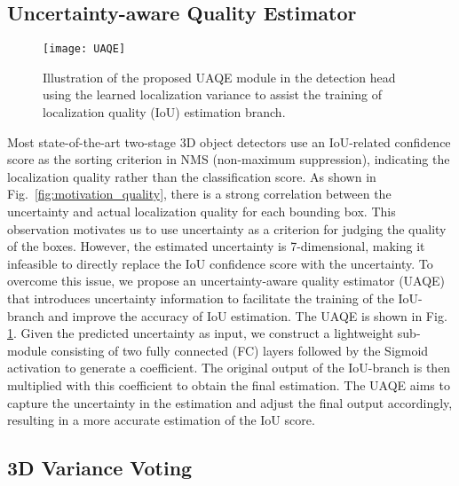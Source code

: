 \documentclass[twocolumn]{svjour3}
\begin{document}
\subsection{Uncertainty-aware Quality Estimator}\label{sec:UAQE}

\begin{figure}[t]
\centering
\texttt{[image: UAQE]}
\caption{Illustration of the proposed UAQE module in the detection head using the learned localization variance to assist the training of localization quality (IoU) estimation branch.}
\label{fig:head}
\end{figure}

Most state-of-the-art two-stage 3D object detectors use an IoU-related confidence score as the sorting criterion in NMS (non-maximum suppression), indicating the localization quality rather than the classification score.
As shown in Fig.~\ref{fig:motivation_quality}, there is a strong correlation between the uncertainty and actual localization quality for each bounding box. This observation motivates us to use uncertainty as a criterion for judging the quality of the boxes. However, the estimated uncertainty is 7-dimensional, making it infeasible to directly replace the IoU confidence score with the uncertainty.
To overcome this issue, we propose an uncertainty-aware quality estimator (UAQE) that introduces uncertainty information to facilitate the training of the IoU-branch and improve the accuracy of IoU estimation. The UAQE is shown in Fig. \ref{fig:head}. Given the predicted uncertainty as input, we construct a lightweight sub-module consisting of two fully connected (FC) layers followed by the Sigmoid activation to generate a coefficient. The original output of the IoU-branch is then multiplied with this coefficient to obtain the final estimation.
The UAQE aims to capture the uncertainty in the estimation and adjust the final output accordingly, resulting in a more accurate estimation of the IoU score. 

\subsection{3D Variance Voting}
\end{document}
